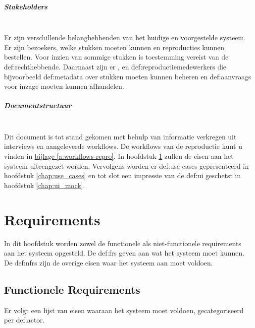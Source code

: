 \documentclass[a4paper,titlepage]{report}
\begin{document}
\paragraph*{Stakeholders}\hfill\\
Er zijn verschillende belanghebbenden van het huidige en voorgestelde systeem.
Er zijn bezoekers, welke stukken moeten kunnen
 en reproducties kunnen bestellen. Voor
inzien van sommige stukken is toestemming vereist van de
\gls{def:rechthebbende}. Daarnaast zijn er
,
 en \glspl{def:reproductiemedewerker}
die bijvoorbeeld \gls{def:metadata} over stukken moeten kunnen beheren en
\glspl{def:aanvraag} voor inzage moeten kunnen afhandelen.

\paragraph*{Documentstructuur}\hfill\\
Dit document is tot stand gekomen met behulp van informatie verkregen uit
interviews en aangeleverde workflows. De workflows van de reproductie kunt u vinden in
\hyperref[a:workflows-repro]{bijlage \ref{a:workflows-repro}}.
In hoofdstuk \ref{chap:requirements} zullen de eisen aan het systeem uiteengezet
worden. Vervolgens worden er \glspl{def:use-case} gepresenteerd in hoofdstuk
\ref{chap:use_cases} en tot slot een impressie van de \gls{def:ui} geschetst
in hoofdstuk \ref{chap:ui_mock}.

\chapter{Requirements}
\label{chap:requirements}
In dit hoofdstuk worden zowel de functionele als niet-functionele requirements
aan het systeem opgesteld. De \glspl{def:fr} geven aan wat het
systeem moet kunnen. De \glspl{def:nfr} zijn de overige eisen
waar het systeem aan moet voldoen.

  \section{Functionele Requirements}
    Er volgt een lijst van eisen waaraan het systeem moet voldoen,
    gecategoriseerd per \gls{def:actor}.
\end{document}
